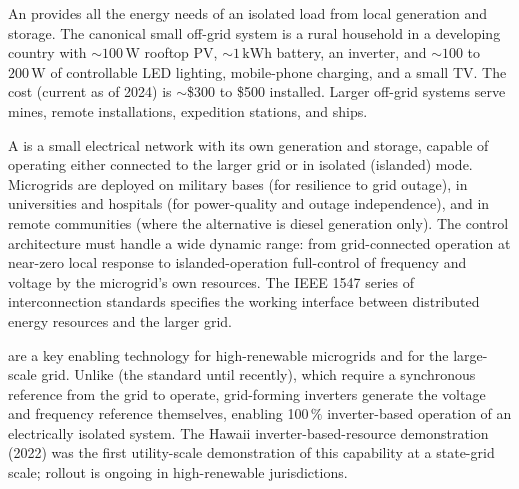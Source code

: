 An  provides all the energy needs of an
isolated load from local generation and storage. The canonical small
off-grid system is a rural household in a developing country with
$\sim 100\,\si{\watt}$ rooftop PV, $\sim 1\,\si{\kilo\watt\hour}$
battery, an inverter, and $\sim 100$ to $200\,\si{\watt}$ of
controllable LED lighting, mobile-phone charging, and a small TV.
The cost (current as of 2024) is $\sim$\$300 to \$500 installed.
Larger off-grid systems serve mines, remote installations,
expedition stations, and ships.

A  is a small electrical network with its own
generation and storage, capable of operating either connected to the
larger grid or in isolated (islanded) mode. Microgrids are deployed
on military bases (for resilience to grid outage), in universities
and hospitals (for power-quality and outage independence), and in
remote communities (where the alternative is diesel generation only).
The control architecture must handle a wide dynamic range: from
grid-connected operation at near-zero local response to
islanded-operation full-control of frequency and voltage by the
microgrid's own resources. The IEEE 1547 series of interconnection
standards specifies the working interface between distributed
energy resources and the larger grid.

 are a key enabling technology for
high-renewable microgrids and for the large-scale grid. Unlike
 (the standard until recently),
which require a synchronous reference from the grid to operate,
grid-forming inverters generate the voltage and frequency reference
themselves, enabling 100$\,\%$ inverter-based operation of an
electrically isolated system. The Hawaii inverter-based-resource
demonstration (2022) was the first utility-scale demonstration of
this capability at a state-grid scale; rollout is ongoing in
high-renewable jurisdictions.

